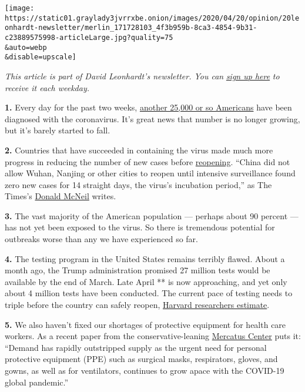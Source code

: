 \texttt{[image: https://static01.graylady3jvrrxbe.onion/images/2020/04/20/opinion/20leonhardt-newsletter/merlin\_171728103\_4f3b959b-8ca3-4854-9b31-c23889575998-articleLarge.jpg?quality=75\\\&auto=webp\\\&disable=upscale]}

\emph{This article is part of David Leonhardt's newsletter. You can}
\href{https://www.nytimes3xbfgragh.onion/newsletters/opiniontoday?action=click\&module=Intentional\&pgtype=Article}{\emph{sign
up here}} \emph{to receive it each weekday.}

\textbf{1.} Every day for the past two weeks,
\href{https://www.nytimes3xbfgragh.onion/interactive/2020/us/coronavirus-us-cases.html}{another
25,000 or so Americans} have been diagnosed with the coronavirus. It's
great news that number is no longer growing, but it's barely started to
fall.

\textbf{2.} Countries that have succeeded in containing the virus made
much more progress in reducing the number of new cases before
\href{https://www.nytimes3xbfgragh.onion/2020/04/24/us/coronavirus-midwest-mayors-reopening.html}{reopening}.
``China did not allow Wuhan, Nanjing or other cities to reopen until
intensive surveillance found zero new cases for 14 straight days, the
virus's incubation period,'' as The Times's
\href{https://www.nytimes3xbfgragh.onion/2020/04/18/health/coronavirus-america-future.html}{Donald
McNeil} writes.

\textbf{3.} The vast majority of the American population --- perhaps
about 90 percent --- has not yet been exposed to the virus. So there is
tremendous potential for outbreaks worse than any we have experienced so
far.

\textbf{4.} The testing program in the United States remains terribly
flawed. About a month ago, the Trump administration promised 27 million
tests would be available by the end of March. Late April ** is now
approaching, and yet only about 4 million tests have been conducted. The
current pace of testing needs to triple before the country can safely
reopen,
\href{https://www.nytimes3xbfgragh.onion/interactive/2020/04/17/us/coronavirus-testing-states.html?referringSource=articleShare}{Harvard
researchers estimate}.

\textbf{5.} We also haven't fixed our shortages of protective equipment
for health care workers. As a recent paper from the conservative-leaning
\href{https://www.mercatus.org/publications/covid-19-policy-brief-series/masks-all-using-purchase-guarantees-and-targeted}{Mercatus
Center} puts it: ``Demand has rapidly outstripped supply as the urgent
need for personal protective equipment (PPE) such as surgical masks,
respirators, gloves, and gowns, as well as for ventilators, continues to
grow apace with the COVID-19 global pandemic.''

